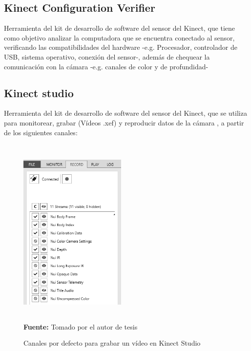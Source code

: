 \subsection{Kinect Configuration Verifier} \label{ins:KinectCheckt}
Herramienta del kit de desarrollo de software del sensor del Kinect, que tiene como objetivo  analizar la computadora que se encuentra conectado al sensor, verificando las compatibilidades del hardware -e.g. Procesador, controlador de USB, sistema operativo, conexi\'on del sensor-, adem\'as de chequear la comunicaci\'on con la c\'amara -e.g. canales de color y de profundidad-
\subsection{Kinect studio} \label{ins:KinectStudio}
Herramienta del kit de desarrollo de software del sensor del Kinect, que se utiliza para monitorear, grabar (V\'ideos .xef) y reproducir datos de la c\'amara \cite{KinectStudio2019}, a partir de los siguientes canales:
\begin{figure}[H]
	\caption{Canales por defecto para grabar un v\'ideo en Kinect Studio }
	\label{fig:streamDefault}
	\centering
	\includegraphics[width=200px,height=360px]{graphics/streamsRecord.PNG} \\
	\textbf{Fuente:} Tomado por el autor de tesis
\end{figure} 
